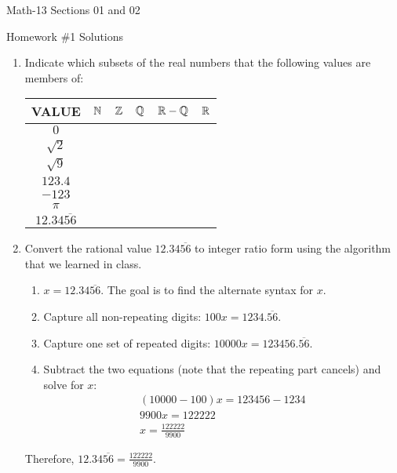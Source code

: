 \documentclass[letterpaper,12pt,fleqn]{article}
\newcommand{\cm}{\checkmark}
\begin{document}
\begin{center}
  \large
  Math-13 Sections 01 and 02

  \Large
  Homework \#1 Solutions
\end{center}

\begin{enumerate}
  \setlength\itemsep{5ex}
\item Indicate which subsets of the real numbers that the following values are members of:

  \bigskip

  \begin{center}
    \renewcommand{\arraystretch}{1.2}
    \begin{tabular}{|c||c|c|c|c|c|}
      \hline
      VALUE & \(\mathbb{N}\) & \(\mathbb{Z}\) & \(\mathbb{Q}\) & \(\mathbb{R}-\mathbb{Q}\) & \(\mathbb{R}\) \\
      \hline
      \hline
      \(0\) & & \cm & \cm & & \cm \\
      \hline
      \(\sqrt{2}\) & & & & \cm & \cm \\
      \hline
      \(\sqrt{9}\) & \cm & \cm & \cm & & \cm \\
      \hline
      \(123.4\) & & & \cm & & \cm \\
      \hline
      \(-123\) & & \cm & \cm & & \cm \\
      \hline
      \(\pi\) & & & & \cm & \cm \\
      \hline
      \(12.34\overline{56}\) & & & \cm & & \cm \\
      \hline
    \end{tabular}
  \end{center}

  \bigskip

\item Convert the rational value \(12.34\overline{56}\) to integer ratio form using the algorithm that we learned
  in class.
  \begin{enumerate}
  \item \(x=12.34\overline{56}\).  The goal is to find the alternate syntax for \(x\).
  \item Capture all non-repeating digits: \(100x=1234.\overline{56}\).
  \item Capture one set of repeated digits: \(10000x=123456.\overline{56}\).
  \item Subtract the two equations (note that the repeating part cancels) and solve for \(x\):
    \begin{gather*}
      (10000-100)x=123456-1234 \\
      9900x=122222 \\
      x=\frac{122222}{9900}
    \end{gather*}
  \end{enumerate}
  Therefore, \(12.34\overline{56}=\frac{122222}{9900}\).


\end{enumerate}
\end{document}
